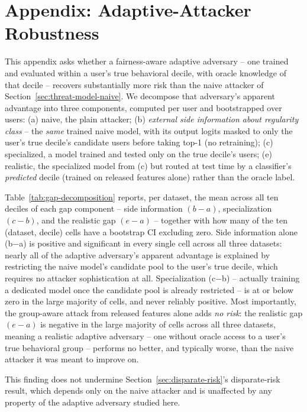 \section{Appendix: Adaptive-Attacker Robustness}
\label{sec:adaptive-appendix}

This appendix asks whether a fairness-aware adaptive adversary -- one
trained and evaluated within a user's true behavioral decile, with
oracle knowledge of that decile -- recovers substantially more risk
than the naive attacker of Section~\ref{sec:threat-model-naive}. We
decompose that adversary's
apparent advantage into three components, computed per user and
bootstrapped over users: (a) naive, the plain attacker;
(b) \emph{external side information about regularity class} -- the
\emph{same} trained naive model, with its output logits masked to only
the user's true decile's candidate users before taking top-1 (no
retraining); (c) specialized, a model trained and tested only on the
true decile's users; (e) realistic, the specialized model from (c) but
routed at test time by a classifier's \emph{predicted} decile (trained
on released features alone) rather than the oracle label.

Table~\ref{tab:gap-decomposition} reports, per dataset, the mean across
all ten deciles of each gap component -- side information $(b-a)$,
specialization $(c-b)$, and the realistic gap $(e-a)$ -- together with
how many of the ten (dataset, decile) cells have a bootstrap CI
excluding zero. Side information alone (b$-$a) is positive and
significant in every single cell across all three datasets: nearly all
of the adaptive adversary's apparent advantage is explained by
restricting the naive model's candidate pool to the user's true
decile, which requires no attacker sophistication at all.
Specialization (c$-$b) -- actually training a dedicated model once the
candidate pool is already restricted -- is at or below zero in the
large majority of cells, and never reliably positive. Most
importantly, the group-aware attack from released features alone adds
\emph{no risk}: the realistic gap $(e-a)$ is negative in the large
majority of cells across all three datasets, meaning a realistic
adaptive adversary -- one without oracle access to a user's true
behavioral group -- performs no better, and typically worse, than the
naive attacker it was meant to improve on.



This finding does not undermine Section~\ref{sec:disparate-risk}'s
disparate-risk result, which depends only on the naive attacker and is
unaffected by any property of the adaptive adversary studied here.
